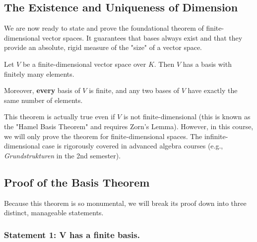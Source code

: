 \subsection{The Existence and Uniqueness of Dimension}

We are now ready to state and prove the foundational theorem of finite-dimensional vector spaces. It guarantees that bases always exist and that they provide an absolute, rigid measure of the "size" of a vector space.

\begin{theorem}
Let $V$ be a finite-dimensional vector space over $K$. Then $V$ has a basis with finitely many elements. 

Moreover, \textbf{every} basis of $V$ is finite, and any two bases of $V$ have exactly the same number of elements.
\end{theorem}

\begin{remark}
This theorem is actually true even if $V$ is not finite-dimensional (this is known as the "Hamel Basis Theorem" and requires Zorn's Lemma). However, in this course, we will only prove the theorem for finite-dimensional spaces. The infinite-dimensional case is rigorously covered in advanced algebra courses (e.g., \textit{Grundstrukturen} in the 2nd semester).
\end{remark}

\subsection{Proof of the Basis Theorem}

Because this theorem is so monumental, we will break its proof down into three distinct, manageable statements. 

\subsubsection*{Statement 1: V has a finite basis.}

